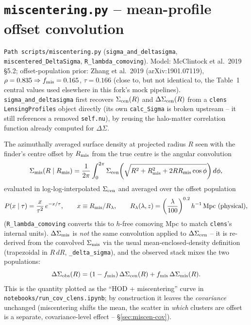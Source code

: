 \documentclass[a4paper, 11pt]{article}
\newcommand{\hMpc}{h^{-1}\,\mathrm{Mpc}}
\newcommand{\modname}[1]{\textcolor{kwcol}{\texttt{#1}}}
\newcommand{\pyfile}[1]{{\small\texttt{#1}}}
\begin{document}
\section{\pyfile{miscentering.py} -- mean-profile offset convolution}
\label{sec:miscen-mean}

\modname{Path}\ \pyfile{scripts/miscentering.py}
(\texttt{sigma\_and\_deltasigma}, \texttt{miscentered\_DeltaSigma},
\texttt{R\_lambda\_comoving}). Model: McClintock et al.\ 2019 \S5.2;
offset-population prior: Zhang et al.\ 2019 (arXiv:1901.07119),
$\rho = 0.835 \Rightarrow f_{\rm mis}=0.165$, $\tau=0.166$ (close to,
but not identical to, the Table~1 central values used elsewhere in
this fork's mock pipelines). \texttt{sigma\_and\_deltasigma} first
recovers $\Sigma_{\rm cen}(R)$ and $\Delta\Sigma_{\rm cen}(R)$ from a
\modname{clens} \texttt{LensingProfiles} object directly (its own
\texttt{calc\_Sigma} is broken upstream -- it still references a
removed \texttt{self.nu}), by reusing the halo-matter correlation
function already computed for $\Delta\Sigma$.

The azimuthally averaged surface density at projected radius $R$ seen
with the finder's centre offset by $R_{\rm mis}$ from the true centre
is the angular convolution
\begin{equation}
  \Sigma_{\rm mis}(R\mid R_{\rm mis}) = \frac{1}{2\pi}
    \int_0^{2\pi} \Sigma_{\rm cen}\!\left(
      \sqrt{R^2+R_{\rm mis}^2+2RR_{\rm mis}\cos\phi}\right)d\phi,
\end{equation}
evaluated in log-log-interpolated $\Sigma_{\rm cen}$ and averaged over
the offset population
\begin{equation}
  P(x\mid\tau) = \frac{x}{\tau^2}\,e^{-x/\tau}, \qquad
  x \equiv R_{\rm mis}/R_\lambda, \qquad
  R_\lambda(\lambda,z) = \left(\frac{\lambda}{100}\right)^{0.2}
    \hMpc\ \text{(physical)},
\end{equation}
(\texttt{R\_lambda\_comoving} converts this to $h$-free comoving Mpc
to match \modname{clens}'s internal units). $\Delta\Sigma_{\rm mis}$
is \emph{not} the same convolution applied to $\Delta\Sigma_{\rm
cen}$ -- it is re-derived from the convolved $\Sigma_{\rm mis}$ via the
usual mean-enclosed-density definition (trapezoidal in $R\,dR$,
\texttt{\_delta\_sigma}), and the observed stack mixes the two
populations:
\begin{equation}
  \Delta\Sigma_{\rm obs}(R) = (1-f_{\rm mis})\,\Delta\Sigma_{\rm cen}(R)
    + f_{\rm mis}\,\Delta\Sigma_{\rm mis}(R).
\end{equation}
This is the quantity plotted as the ``HOD + miscentering'' curve in
\pyfile{notebooks/run\_cov\_clens.ipynb}; by construction it leaves
the \emph{covariance} unchanged (miscentering shifts the mean, the
scatter in \emph{which} clusters are offset is a separate,
covariance-level effect -- \S\ref{sec:miscen-cov}).
\end{document}
